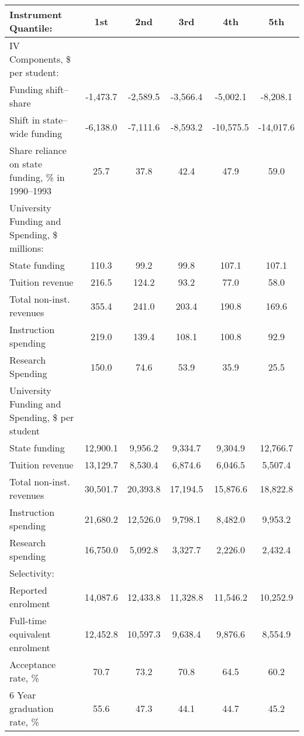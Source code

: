 \begin{tabular}{lccccc}
  \hline
Instrument Quantile: & 1st & 2nd & 3rd & 4th & 5th \\ 
  \hline
IV Components, \$ per student: &  &  &  &  &  \\ 
  Funding shift--share & -1,473.7 & -2,589.5 & -3,566.4 & -5,002.1 & -8,208.1 \\ 
  Shift in state--wide funding & -6,138.0 & -7,111.6 & -8,593.2 & -10,575.5 & -14,017.6 \\ 
  Share reliance on state funding, \% in 1990--1993 & 25.7 & 37.8 & 42.4 & 47.9 & 59.0 \\ 
  \hline University Funding and Spending, \$ millions: &  &  &  &  &  \\ 
  State funding & 110.3 & 99.2 & 99.8 & 107.1 & 107.1 \\ 
  Tuition revenue & 216.5 & 124.2 & 93.2 & 77.0 & 58.0 \\ 
  Total non-inst. revenues & 355.4 & 241.0 & 203.4 & 190.8 & 169.6 \\ 
  Instruction spending & 219.0 & 139.4 & 108.1 & 100.8 & 92.9 \\ 
  Research Spending & 150.0 & 74.6 & 53.9 & 35.9 & 25.5 \\ 
  \hline University Funding and Spending, \$ per student &  &  &  &  &  \\ 
  State funding & 12,900.1 & 9,956.2 & 9,334.7 & 9,304.9 & 12,766.7 \\ 
  Tuition revenue & 13,129.7 & 8,530.4 & 6,874.6 & 6,046.5 & 5,507.4 \\ 
  Total non-inst. revenues & 30,501.7 & 20,393.8 & 17,194.5 & 15,876.6 & 18,822.8 \\ 
  Instruction spending & 21,680.2 & 12,526.0 & 9,798.1 & 8,482.0 & 9,953.2 \\ 
  Research spending & 16,750.0 & 5,092.8 & 3,327.7 & 2,226.0 & 2,432.4 \\ 
  \hline Selectivity: &  &  &  &  &  \\ 
  Reported enrolment & 14,087.6 & 12,433.8 & 11,328.8 & 11,546.2 & 10,252.9 \\ 
  Full-time equivalent enrolment & 12,452.8 & 10,597.3 & 9,638.4 & 9,876.6 & 8,554.9 \\ 
  Acceptance rate, \% & 70.7 & 73.2 & 70.8 & 64.5 & 60.2 \\ 
  6 Year graduation rate, \% & 55.6 & 47.3 & 44.1 & 44.7 & 45.2 \\ 
   \hline
\end{tabular}
